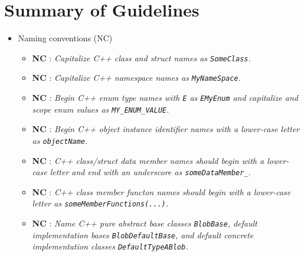 %
\section{Summary of Guidelines}
\label{sec:summary_guidelines}
%

\begin{itemize}

\item Naming conventions (NC)

  \setcounter{Thyra_NC_counter}{0}

  \begin{itemize}

  {}\item{}\textbf{NC }:
  {}\textit{Capitalize C++ class and struct names as {}\texttt{SomeClass}.}

  {}\item{}\textbf{NC }:
  {}\textit{Capitalize C++ namespace names as {}\texttt{MyNameSpace}.}

  {}\item{}\textbf{NC }:
  {}\textit{Begin C++ enum type names with {}\texttt{E} as {}\texttt{EMyEnum}
  and capitalize and scope enum values as {}\texttt{MY\_ENUM\_VALUE}.}

  {}\item{}\textbf{NC }:
  {}\textit{Begin C++ object instance identifier names with a lower-case
  letter as {}\texttt{objectName}.}

  {}\item{}\textbf{NC }:
  {}\textit{C++ class/struct data member names should begin with a lower-case
  letter and end with an underscore as {}\texttt{someDataMember\_}.}

  {}\item{}\textbf{NC }:
  {}\textit{C++ class member functon names should begin with a lower-case
  letter as {}\texttt{someMemberFunctions(...)}.}

  {}\item{}\textbf{NC }:
  {}\textit{Name C++ pure abstract base classes {}\texttt{BlobBase}, default
  implementation bases {}\texttt{BlobDefaultBase}, and default concrete
  implementation classes {}\texttt{DefaultTypeABlob}.}


\end{itemize}
\end{itemize}
